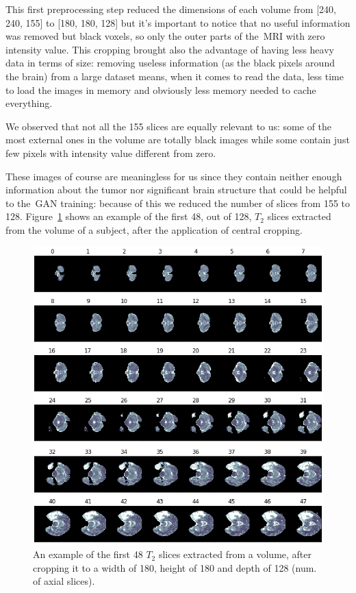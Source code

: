 This first preprocessing step reduced the dimensions of each volume from [240, 240, 155] to [180, 180, 128] but it's important to notice that no useful information was removed but black voxels, so only the outer parts of the~\ac{MRI} with zero intensity value.
This cropping brought also the advantage of having less heavy data in terms of size: removing useless information (as the black pixels around the brain) from a large dataset means, when it comes to read the data, less time to load the images in memory and obviously less memory needed to cache everything.

\vspace{2mm} %
We observed that not all the 155 slices are equally relevant to us: some of the most external ones in the volume are totally black images while some contain just few pixels with intensity value different from zero. 

These images of course are meaningless for us since they contain neither enough information about the tumor nor significant brain structure that could be helpful to the~\ac{GAN} training: because  of this we reduced the number of slices from 155 to 128. Figure~\ref{fig:slices} shows an example of the first 48, out of 128, $T_{2}$ slices extracted from the volume of a subject, after the application of central cropping.

\begin{figure}
\centering
\includegraphics[height=0.65\textheight]{images/slices2.pdf}
\caption[An example of consecutive $T_{2}$ slices extracted from a volume]{An example of the first 48 $T_{2}$ slices extracted from a volume, after cropping it to a width of 180, height of 180 and depth of 128 (num. of axial slices).}
\label{fig:slices}
\end{figure}

